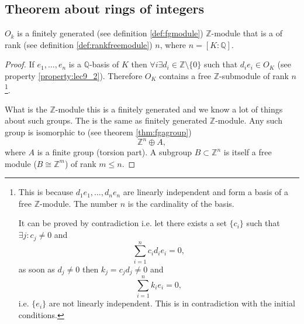 \subsection{Theorem about rings of integers}
\begin{theorem}
  $O_k$ is a finitely generated (see definition \ref{def:fgmodule})
  $\mathbb{Z}$-module that is a  of
  rank (see definition \ref{def:rankfreemodule}) $n$, where $n=
  \left[K:\mathbb{Q}\right]$. 
  \label{thm:lec9_1}
  \begin{proof}
    If $e_1, \dots, e_n$ is a $\mathbb{Q}$-basis of $K$ then
    $\forall i \exists d_i \in \mathbb{Z} \setminus
    \{0\}$ such that $d_i e_i \in O_K$ (see property
    \ref{property:lec9_2}). Therefore $O_K$ contains a free
    $\mathbb{Z}$-submodule of rank $n$
    \footnote{
      This is because $d_1 e_1, \dots, d_n e_n$ are linearly
      independent and form a basis of a free $\mathbb{Z}$-module. The
      number $n$ is the cardinality of the basis.

      It can be proved by contradiction i.e. let there exists a set
      $\{c_i\}$ such that $\exists j: c_j \ne 0$ and
      \[
      \sum_{i=1}^n c_i d_i e_i = 0,
      \]
      as soon as $d_j \ne 0$ then $k_j = c_j d_j \ne 0$ and
      \[
      \sum_{i=1}^n k_i e_i = 0,
      \]
      i.e. $\{e_i\}$ are not linearly independent. This is in
      contradiction with the initial conditions.
    }.

    What is the $\mathbb{Z}$-module this is a finitely generated
     and we know a lot of things about such
    groups. The  is the same as
    finitely generated $\mathbb{Z}$-module. Any such group is isomorphic
    to (see theorem \ref{thm:fgagroup})
    \[
    \mathbb{Z}^n \oplus A,
    \]
    where $A$ is a finite group (torsion part). A subgroup
    $B \subset \mathbb{Z}^n$ is itself a free module ($B \cong \mathbb{Z}^m$)
    of rank $m \le n$.


\end{proof}
\end{theorem}
